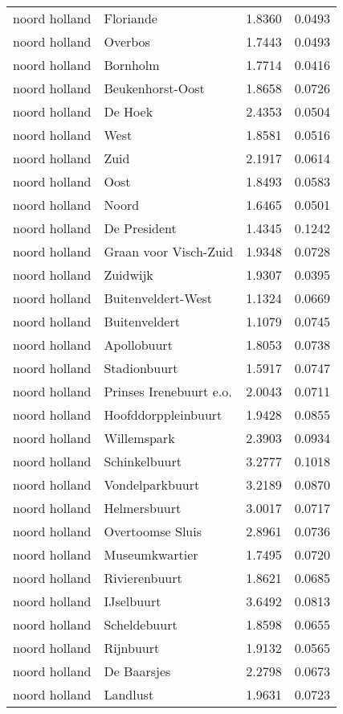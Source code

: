 \begin{longtable}{llcc}
noord holland & Floriande & 1.8360 & 0.0493 \\
noord holland & Overbos & 1.7443 & 0.0493 \\
noord holland & Bornholm & 1.7714 & 0.0416 \\
noord holland & Beukenhorst-Oost & 1.8658 & 0.0726 \\
noord holland & De Hoek & 2.4353 & 0.0504 \\
noord holland & West & 1.8581 & 0.0516 \\
noord holland & Zuid & 2.1917 & 0.0614 \\
noord holland & Oost & 1.8493 & 0.0583 \\
noord holland & Noord & 1.6465 & 0.0501 \\
noord holland & De President & 1.4345 & 0.1242 \\
noord holland & Graan voor Visch-Zuid & 1.9348 & 0.0728 \\
noord holland & Zuidwijk & 1.9307 & 0.0395 \\
noord holland & Buitenveldert-West & 1.1324 & 0.0669 \\
noord holland & Buitenveldert & 1.1079 & 0.0745 \\
noord holland & Apollobuurt & 1.8053 & 0.0738 \\
noord holland & Stadionbuurt & 1.5917 & 0.0747 \\
noord holland & Prinses Irenebuurt e.o. & 2.0043 & 0.0711 \\
noord holland & Hoofddorppleinbuurt & 1.9428 & 0.0855 \\
noord holland & Willemspark & 2.3903 & 0.0934 \\
noord holland & Schinkelbuurt & 3.2777 & 0.1018 \\
noord holland & Vondelparkbuurt & 3.2189 & 0.0870 \\
noord holland & Helmersbuurt & 3.0017 & 0.0717 \\
noord holland & Overtoomse Sluis & 2.8961 & 0.0736 \\
noord holland & Museumkwartier & 1.7495 & 0.0720 \\
noord holland & Rivierenbuurt & 1.8621 & 0.0685 \\
noord holland & IJselbuurt & 3.6492 & 0.0813 \\
noord holland & Scheldebuurt & 1.8598 & 0.0655 \\
noord holland & Rijnbuurt & 1.9132 & 0.0565 \\
noord holland & De Baarsjes & 2.2798 & 0.0673 \\
noord holland & Landlust & 1.9631 & 0.0723 \\

\end{longtable}

